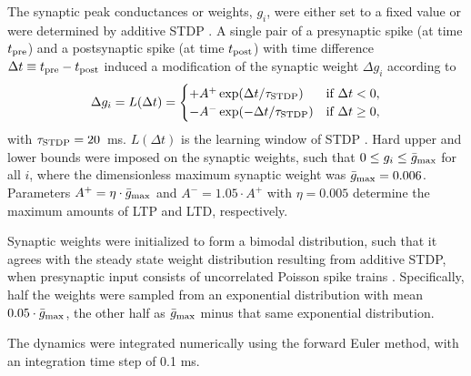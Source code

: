 The synaptic peak conductances or weights, $g_i$, were either set to a fixed value or were determined by additive STDP \cite{Song2000}. A single pair of a presynaptic spike (at time $t_{\rm pre}$) and a postsynaptic spike (at time $t_{\rm post}$) with time difference $\Delta t\equiv t_{\rm pre} - t_{\rm post}$ induced a modification of the synaptic weight $\Delta g_i$ according to
\begin{align}
\Delta g_i= L(\Delta t) =
	\begin{cases}
	    + A^+ \exp(\Delta t /\tau_{\rm STDP}) &  \text{if $\Delta t<0$},\\
	    -A^- \exp(-\Delta t /\tau_{\rm STDP}) &  \text{if $\Delta t\ge0$},
	\end{cases}
	\label{eq:spiking_additive_STDP}
\end{align}
with $\tau_{\rm STDP}=20$~ms. $L(\Delta t)$ is the learning window of STDP \cite{Song2000}. Hard upper and lower bounds were imposed on the synaptic weights, such that $0\le g_i \le \bar{g}_{\rm max}$ for all $i$, where the dimensionless maximum synaptic weight was $\bar{g}_{\rm max}=0.006$. Parameters $A^+=\eta \cdot \bar{g}_{\rm max}$
and $A^-=1.05 \cdot A^+$
with $\eta=0.005$
determine the maximum amounts of LTP and LTD, respectively.

Synaptic weights were initialized to form a bimodal distribution, such that it agrees with the steady state weight distribution resulting from additive STDP, when presynaptic input consists of uncorrelated Poisson spike trains \cite{Song2000}. Specifically, half the weights were sampled from an exponential distribution with mean $0.05 \cdot \bar{g}_{\rm max}$, the other half as $\bar{g}_{\rm max}$ minus that same exponential distribution.

The dynamics were integrated numerically using the forward Euler method, with an integration time step of 0.1 ms.



